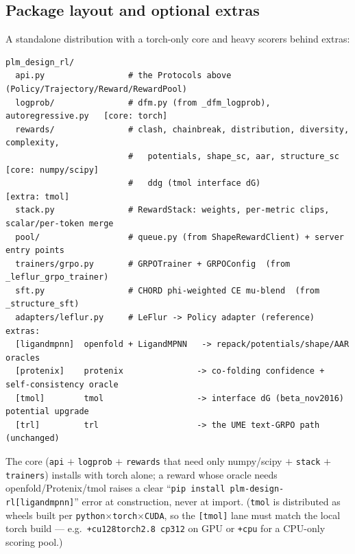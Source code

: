 \documentclass[11pt]{article}
\newcommand{\ttk}[1]{\texttt{\small #1}}
\begin{document}
\subsection{Package layout and optional extras}
A standalone distribution with a torch-only core and heavy scorers behind extras:
\begin{verbatim}
plm_design_rl/
  api.py                 # the Protocols above (Policy/Trajectory/Reward/RewardPool)
  logprob/               # dfm.py (from _dfm_logprob), autoregressive.py   [core: torch]
  rewards/               # clash, chainbreak, distribution, diversity, complexity,
                         #   potentials, shape_sc, aar, structure_sc  [core: numpy/scipy]
                         #   ddg (tmol interface dG)                   [extra: tmol]
  stack.py               # RewardStack: weights, per-metric clips, scalar/per-token merge
  pool/                  # queue.py (from ShapeRewardClient) + server entry points
  trainers/grpo.py       # GRPOTrainer + GRPOConfig  (from _leflur_grpo_trainer)
  sft.py                 # CHORD phi-weighted CE mu-blend  (from _structure_sft)
  adapters/leflur.py     # LeFlur -> Policy adapter (reference)
extras:
  [ligandmpnn]  openfold + LigandMPNN   -> repack/potentials/shape/AAR oracles
  [protenix]    protenix               -> co-folding confidence + self-consistency oracle
  [tmol]        tmol                   -> interface dG (beta_nov2016) potential upgrade
  [trl]         trl                    -> the UME text-GRPO path (unchanged)
\end{verbatim}
The core (\ttk{api} $+$ \ttk{logprob} $+$ \ttk{rewards} that need only numpy/scipy $+$ \ttk{stack}
$+$ \ttk{trainers}) installs with torch alone; a reward whose oracle needs openfold/Protenix/tmol
raises a clear ``\ttk{pip install plm-design-rl[ligandmpnn]}'' error at construction, never at import.
(\ttk{tmol} is distributed as wheels built per \ttk{python}$\times$\ttk{torch}$\times$\ttk{CUDA}, so
the \ttk{[tmol]} lane must match the local torch build --- e.g.\ \ttk{+cu128torch2.8 cp312} on GPU or
\ttk{+cpu} for a CPU-only scoring pool.)
\end{document}
